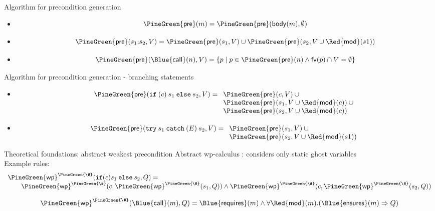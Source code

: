 \documentclass[final,nocolorBG,a4,marieke,nototal,pdf, accumulate,slideColor]{prosper}
\begin{document}
\begin{slide}{Algorithm for precondition generation}
\begin{itemize}
   \item {}
\[\mathsf{\PineGreen{pre}}(m)  =  \mathsf{\PineGreen{pre}}(\mathsf{body}(m), \emptyset)\]
   \item {}
\[\mathsf{\PineGreen{pre}}(s_1 \mathtt{;} s_2, V)  =  \mathsf{\PineGreen{pre}}(s_1, V) \cup 
                                          \mathsf{\PineGreen{pre}}(s_2, V \cup
\mathsf{\Red{mod}}(s1))\]
   \item {}
\[\mathsf{\PineGreen{pre}}(\mathsf{\Blue{call}}(n),V)  =  
                \{ p \mid p \in \mathsf{\PineGreen{pre}}(n) \wedge 
                          \mathsf{fv}(p) \cap V = \emptyset\}\]
\end{itemize}
\end{slide}

\begin{slide}{Algorithm for precondition generation - branching statements}
\begin{itemize}
   \item {}
\[
\mathsf{\PineGreen{pre}}(\mathtt{if\:(} c \mathtt{)\:} s_1 \mathtt{\:else\:} s_2,
V)  = 
\begin{array}[t]{l}
   \mathsf{\PineGreen{pre}}(c, V) \:\cup \\
   \mathsf{\PineGreen{pre}}(s_1, V \cup \mathsf{\Red{mod}}(c)) \:\cup\\
   \mathsf{\PineGreen{pre}}(s_2, V \cup \mathsf{\Red{mod}}(c))
\end{array}\]
\item {}
\[\mathsf{\PineGreen{pre}}(\mathtt{try\:} s_1 \mathtt{\:catch\:(} E \mathtt{)\:} s_2, V)  =  \begin{array}[t]{l}
   \mathsf{\PineGreen{pre}}(s_1, V) \:\cup \\
   \mathsf{\PineGreen{pre}}(s_2, V \cup \mathsf{\Red{mod}}(s1))
  \end{array}\]
\end{itemize}
\end{slide}



\begin{slide}{Theoretical foundations: abstract weakest precondition}
Abstract wp-calculus : considers only static 
ghost variables\\
Example rules:
\[
\begin{array}{l}
\mathsf{\PineGreen{wp}}^{\PineGreen{\#}}(\mathtt{if
(}c\mathtt{)}s_1\mathtt{\:else\:}s_2,Q) =\\
\qquad
\mathsf{\PineGreen{wp}}^{\PineGreen{\#}}(c, \mathsf{\PineGreen{wp}}^{\PineGreen{\#}}(s_1, Q)) \wedge
\mathsf{\PineGreen{wp}}^{\PineGreen{\#}}(c,
\mathsf{\PineGreen{wp}}^{\PineGreen{\#}}(s_2, Q))
\end{array}
\]

\[
\mathsf{\PineGreen{wp}}^{\PineGreen{\#}}(\mathsf{\Blue{call}}(m), Q) =
  \mathsf{\Blue{requires}}(m) \wedge 
  \forall \mathsf{\Red{mod}}(m). (\mathsf{\Blue{ensures}}(m) \Rightarrow Q)
\]
\end{slide}
\end{document}
